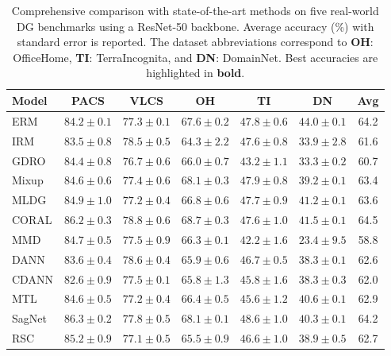 \documentclass[preprint,12pt]{elsarticle}
\begin{document}
\begin{table}[t]
\caption{
    Comprehensive comparison with state-of-the-art methods on five real-world DG benchmarks using a ResNet-50 backbone. 
    Average accuracy (\%) with standard error is reported. 
    The dataset abbreviations correspond to \textbf{OH}: OfficeHome, \textbf{TI}: TerraIncognita, and \textbf{DN}: DomainNet.
    Best accuracies are highlighted in \textbf{bold}.}
\label{tab:real_results}
\centering
\begingroup \footnotesize \renewcommand{\arraystretch}{0.4} \begin{tabular}{lcccccc}
\toprule
\textbf{Model} & \textbf{PACS} & \textbf{VLCS} & \textbf{OH} & \textbf{TI} & \textbf{DN} & \textbf{Avg} \\
\midrule
ERM \citep{vapnik1999nature} & $84.2 \pm 0.1$ & $77.3 \pm 0.1$ & $67.6 \pm 0.2$ & $47.8 \pm 0.6$ & $44.0 \pm 0.1$ & 64.2 \\
IRM \citep{arjovsky2019invariant} & $83.5 \pm 0.8$ & $78.5 \pm 0.5$ & $64.3 \pm 2.2$ & $47.6 \pm 0.8$ & $33.9 \pm 2.8$ & 61.6 \\
GDRO \citep{sagawa2019distributionally} & $84.4 \pm 0.8$ & $76.7 \pm 0.6$ & $66.0 \pm 0.7$ & $43.2 \pm 1.1$ & $33.3 \pm 0.2$ & 60.7 \\
Mixup \citep{zhang2018mixup} & $84.6 \pm 0.6$ & $77.4 \pm 0.6$ & $68.1 \pm 0.3$ & $47.9 \pm 0.8$ & $39.2 \pm 0.1$ & 63.4 \\
MLDG \citep{li2018learning_meta} & $84.9 \pm 1.0$ & $77.2 \pm 0.4$ & $66.8 \pm 0.6$ & $47.7 \pm 0.9$ & $41.2 \pm 0.1$ & 63.6 \\
CORAL \citep{sun2016deep} & $86.2 \pm 0.3$ & $78.8 \pm 0.6$ & $68.7 \pm 0.3$ & $47.6 \pm 1.0$ & $41.5 \pm 0.1$ & 64.5 \\
MMD \citep{li2018domain_mmd} & $84.7 \pm 0.5$ & $77.5 \pm 0.9$ & $66.3 \pm 0.1$ & $42.2 \pm 1.6$ & $23.4 \pm 9.5$ & 58.8 \\
DANN \citep{ganin2016domain} & $83.6 \pm 0.4$ & $78.6 \pm 0.4$ & $65.9 \pm 0.6$ & $46.7 \pm 0.5$ & $38.3 \pm 0.1$ & 62.6 \\
CDANN \citep{li2018deep_cdann} & $82.6 \pm 0.9$ & $77.5 \pm 0.1$ & $65.8 \pm 1.3$ & $45.8 \pm 1.6$ & $38.3 \pm 0.3$ & 62.0 \\
MTL \citep{blanchard2021domain} & $84.6 \pm 0.5$ & $77.2 \pm 0.4$ & $66.4 \pm 0.5$ & $45.6 \pm 1.2$ & $40.6 \pm 0.1$ & 62.9 \\
SagNet \citep{nam2021reducing} & $86.3 \pm 0.2$ & $77.8 \pm 0.5$ & $68.1 \pm 0.1$ & $48.6 \pm 1.0$ & $40.3 \pm 0.1$ & 64.2 \\
RSC \citep{huang2020self} & $85.2 \pm 0.9$ & $77.1 \pm 0.5$ & $65.5 \pm 0.9$ & $46.6 \pm 1.0$ & $38.9 \pm 0.5$ & 62.7 \\

\end{tabular}
\end{table}
\end{document}
